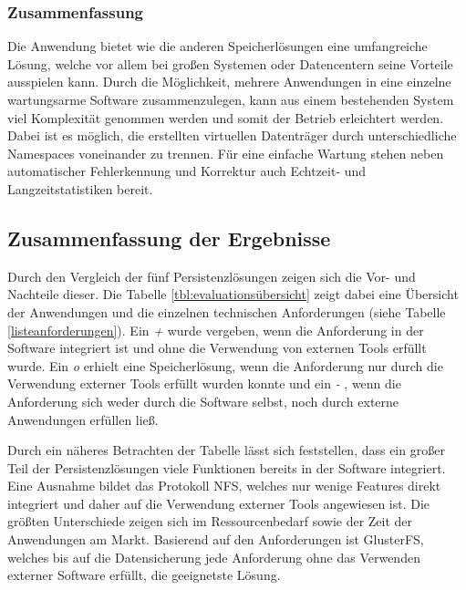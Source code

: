 \subsubsection{Zusammenfassung}
Die Anwendung bietet wie die anderen Speicherlösungen eine umfangreiche Lösung, welche vor allem bei großen Systemen oder Datencentern seine Vorteile ausspielen kann. Durch die Möglichkeit, mehrere Anwendungen in eine einzelne wartungsarme Software zusammenzulegen, kann aus einem bestehenden System viel Komplexität genommen werden und somit der Betrieb erleichtert werden. Dabei ist es möglich, die erstellten virtuellen Datenträger durch unterschiedliche Namespaces voneinander zu trennen. Für eine einfache Wartung stehen neben automatischer Fehlerkennung und Korrektur auch Echtzeit- und Langzeitstatistiken bereit.

\subsection{Zusammenfassung der Ergebnisse}
Durch den Vergleich der fünf Persistenzlösungen zeigen sich die Vor- und Nachteile dieser. Die Tabelle \ref{tbl:evaluationsübersicht} zeigt dabei eine Übersicht der Anwendungen und die einzelnen technischen Anforderungen (siehe Tabelle \ref{listeanforderungen}). Ein \textit{+} wurde vergeben, wenn die Anforderung in der Software integriert ist und ohne die Verwendung von externen Tools erfüllt wurde. Ein \textit{o} erhielt eine Speicherlösung, wenn die Anforderung nur durch die Verwendung externer Tools erfüllt wurden konnte und ein \textit{-} , wenn die Anforderung sich weder durch die Software selbst, noch durch externe Anwendungen erfüllen ließ. \medskip


Durch ein näheres Betrachten der Tabelle lässt sich feststellen, dass ein großer Teil der Persistenzlösungen viele Funktionen bereits in der Software integriert. Eine Ausnahme bildet das Protokoll NFS, welches nur wenige Features direkt integriert und daher auf die Verwendung externer Tools angewiesen ist. Die größten Unterschiede zeigen sich im Ressourcenbedarf sowie der Zeit der Anwendungen am Markt. Basierend auf den Anforderungen ist GlusterFS, welches bis auf die Datensicherung jede Anforderung ohne das Verwenden externer Software erfüllt, die geeignetste Lösung.


